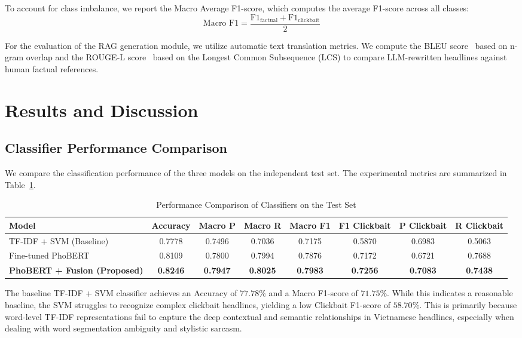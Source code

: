 \documentclass[conference]{IEEEtran}
\begin{document}
To account for class imbalance, we report the Macro Average F1-score, which computes the average F1-score across all classes:
\begin{equation}
\text{Macro F1} = \frac{\text{F1}_{\text{factual}} + \text{F1}_{\text{clickbait}}}{2}
\end{equation}

For the evaluation of the RAG generation module, we utilize automatic text translation metrics. We compute the BLEU score~\cite{papineni2002bleu} based on n-gram overlap and the ROUGE-L score~\cite{lin2004rouge} based on the Longest Common Subsequence (LCS) to compare LLM-rewritten headlines against human factual references.

\section{Results and Discussion}
\subsection{Classifier Performance Comparison}
We compare the classification performance of the three models on the independent test set. The experimental metrics are summarized in Table~\ref{tab:metrics}.

\begin{table}[!t]
\centering
\caption{Performance Comparison of Classifiers on the Test Set}
\label{tab:metrics}
\begin{tabular}{lccccccc}
\toprule
\textbf{Model} & \textbf{Accuracy} & \textbf{Macro P} & \textbf{Macro R} & \textbf{Macro F1} & \textbf{F1 Clickbait} & \textbf{P Clickbait} & \textbf{R Clickbait} \\
\midrule
TF-IDF + SVM (Baseline) & 0.7778 & 0.7496 & 0.7036 & 0.7175 & 0.5870 & 0.6983 & 0.5063 \\
Fine-tuned PhoBERT & 0.8109 & 0.7800 & 0.7994 & 0.7876 & 0.7172 & 0.6721 & 0.7688 \\
\textbf{PhoBERT + Fusion (Proposed)} & \textbf{0.8246} & \textbf{0.7947} & \textbf{0.8025} & \textbf{0.7983} & \textbf{0.7256} & \textbf{0.7083} & \textbf{0.7438} \\
\bottomrule
\end{tabular}
\end{table}


The baseline TF-IDF + SVM classifier achieves an Accuracy of $77.78\%$ and a Macro F1-score of $71.75\%$. While this indicates a reasonable baseline, the SVM struggles to recognize complex clickbait headlines, yielding a low Clickbait F1-score of $58.70\%$. This is primarily because word-level TF-IDF representations fail to capture the deep contextual and semantic relationships in Vietnamese headlines, especially when dealing with word segmentation ambiguity and stylistic sarcasm.
\end{document}
